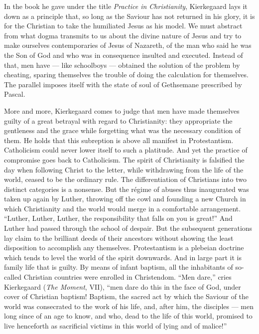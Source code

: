 \documentclass[12pt,a4paper]{article}
\newcommand{\opage}[1]{\marginnote{\footnotesize\textit{[#1]}}}
\begin{document}
In the book he gave under the title \emph{Practice in Christianity},
Kierkegaard lays it down as a principle that, so long as the Saviour has not
returned in his glory, it is for the Christian to take the humiliated Jesus as
his model. We must abstract from what dogma transmits to us about the divine
nature of Jesus and try to make ourselves contemporaries of Jesus of Nazareth,
of the man who said he was the Son of God and who was in consequence insulted
and executed. Instead of that, men have --- like schoolboys --- obtained the
solution of the problem by cheating, sparing themselves the trouble of doing the
calculation for themselves. The parallel imposes itself with the state of soul
of Gethsemane prescribed by Pascal.

More and more, Kierkegaard comes to judge that men have made themselves guilty
of a great betrayal with regard to Christianity: they appropriate the gentleness
and the grace while forgetting what was the necessary condition of them. He
holds that this subreption is above all manifest in Protestantism. Catholicism
could never lower itself to such a platitude. And yet the practice of compromise
goes back to Catholicism. The spirit of Christianity is falsified the day when
following Christ to the letter, while withdrawing from the life of the world,
ceased to be the ordinary rule. The differentiation of Christians into two
distinct categories is a nonsense. But the régime of abuses thus inaugurated was
taken up again by Luther, throwing off the cowl and founding a new Church in
which Christianity and the world would merge in a comfortable arrangement.
``Luther, Luther, Luther, the responsibility that falls on you is great!'' And
Luther had passed through the school of despair. But the subsequent generations
lay claim to the brilliant deeds of their ancestors without showing the least
disposition to accomplish any themselves. Protestantism is a plebeian doctrine
which tends to level the world of the spirit downwards. And in large part it is
family life that is guilty. By
\opage{241}means of infant baptism, all the inhabitants of so-called Christian countries
were enrolled in Christendom. ``Men dare,'' cries Kierkegaard (\emph{The
Moment}, VII), ``men dare do this in the face of God, under cover of Christian
baptism! Baptism, the sacred act by which the Saviour of the world was
consecrated to the work of his life, and, after him, the disciples --- men long
since of an age to know, and who, dead to the life of this world, promised to
live henceforth as sacrificial victims in this world of lying and of malice!''
\end{document}
